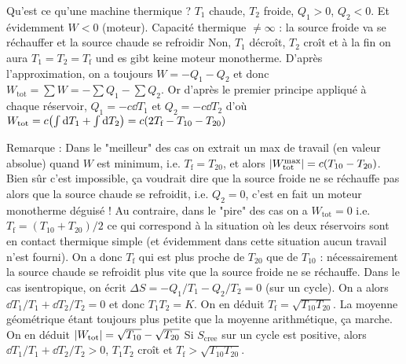 \begin{solution}
\begin{questions}
    \questioncours Qu'est ce qu'une machine thermique ?
    \question $T_1$ chaude, $T_2$ froide, $Q_1 > 0$, $Q_2 < 0$. Et évidemment $W < 0$ (moteur).
    \question Capacité thermique $\neq \infty$ : la source froide va se réchauffer et la source chaude se refroidir
    \question Non, $T_1$ décroît, $T_2$ croît et à la fin on aura $T_1 = T_2 = T_\text{f}$ und es gibt keine moteur monotherme.
    \question D'après l'approximation, on a toujours $W = -Q_1-Q_2$ et donc $W_\text{tot} = \sum W = -\sum Q_1 - \sum Q_2$. Or d'après le premier principe appliqué à chaque réservoir, $Q_1 = -c\dd{T_1}$ et $Q_2 = -c\dd{T_2}$ d'où $W_\text{tot} = c\qty(\int \dd{T_1} + \int\dd{T_2}) = c(2T_\text{f} - T_{10} - T_{20})$
    
    Remarque : Dans le "meilleur" des cas on extrait un max de travail (en valeur absolue) quand $W$ est minimum, i.e. $T_\text{f} = T_{20}$, et alors $\abs{W_\text{tot}^\text{max}} = c(T_{10}-T_{20})$. Bien sûr c'est impossible, ça voudrait dire que la source froide ne se réchauffe pas alors que la source chaude se refroidit, i.e. $Q_2  =0$, c'est en fait un moteur monotherme déguisé ! Au contraire, dans le "pire" des cas on a $W_\text{tot} = 0$ i.e. $T_\text{f} = (T_{10}+T_{20})/2$ ce qui correspond à la situation où les deux réservoirs sont en contact thermique simple (et évidemment dans cette situation aucun travail n'est fourni). On a donc $T_\text{f}$ qui est plus proche de $T_{20}$ que de $T_{10}$ : nécessairement la source chaude se refroidit plus vite que la source froide ne se réchauffe.
    \question Dans le cas isentropique, on écrit $\Delta S = -Q_1/T_1-Q_2/T_2 = 0$ (sur un cycle). On a alors $\dd{T_1}/T_1 + \dd{T_2}/T_2 = 0$ et donc $T_1T_2 = K$. On en déduit $T_\text{f} = \sqrt{T_{10}T_{20}}$. La moyenne géométrique étant toujours plus petite que la moyenne arithmétique, ça marche. On en déduit $\abs{W_\text{tot}} = \sqrt{T_{10}} - \sqrt{T_{20}}$
    \question Si $S_\text{cree}$ sur un cycle est positive, alors $\dd{T_1}/T_1 + \dd{T_2}/T_2 > 0$, $T_1T_2$ croît et $T_\text{f} > \sqrt{T_{10}T_{20}}$.
\end{questions}
\end{solution}